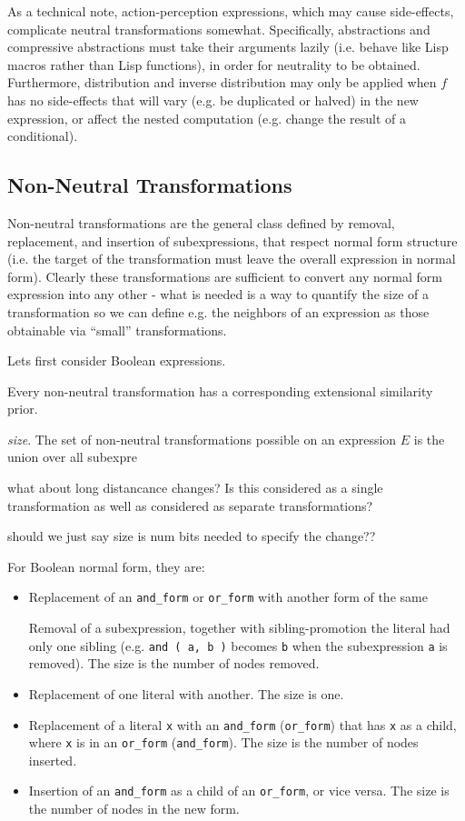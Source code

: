 \documentclass[letterpaper]{article}
\begin{document}
As a technical note, action-perception expressions, which may cause
side-effects, complicate neutral transformations somewhat. Specifically,
abstractions and compressive abstractions must take their arguments lazily
(i.e. behave like Lisp macros rather than Lisp functions), in order for
neutrality to be obtained. Furthermore, distribution and inverse distribution
may only be applied when $f$ has no side-effects that will vary (e.g. be
duplicated or halved) in the new expression, or affect the nested computation
(e.g. change the result of a conditional).

\subsection{Non-Neutral Transformations}

Non-neutral transformations are the general class defined by removal,
replacement, and insertion of subexpressions, that respect normal form
structure (i.e. the target of the transformation must leave the overall
expression in normal form). Clearly these transformations are sufficient to
convert any normal form expression into any other - what is needed is a way to
quantify the size of a transformation so we can define e.g. the neighbors of an
expression as those obtainable via ``small'' transformations.

Lets first consider Boolean expressions. 

Every non-neutral transformation
has a corresponding extensional similarity prior. 

\emph{size}. The set of non-neutral transformations
possible on an expression $E$ is the union over all subexpre

what about long distancance changes? Is this considered as a single
transformation as well as considered as separate transformations?

should we just say size is num bits needed to specify the change??

For Boolean normal form, they are:
\begin{itemize}
\item Replacement of an \verb|and_form| or \verb|or_form| with another form of
  the same 

Removal of a subexpression, together with sibling-promotion the literal
  had only one sibling (e.g. \verb|and ( a, b )| becomes \verb|b| when the
  subexpression \verb|a| is removed). The size is the number of nodes removed.
\item Replacement of one literal with another. The size is one.
\item Replacement of a literal \verb|x| with an \verb|and_form|
  (\verb|or_form|) that has \verb|x| as a child, where \verb|x| is in an
  \verb|or_form| (\verb|and_form|). The size is the number of nodes inserted.
\item Insertion of an \verb|and_form| as a child of an \verb|or_form|, or vice
  versa. The size is the number of nodes in the new form.
\end{itemize}
\end{document}

